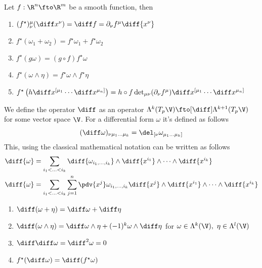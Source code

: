 \documentclass[../mmf.tex]{subfiles}
\begin{document}
\begin{thm}
	Let $f:\R^n\fto\R^m$ be a smooth function, then
	\begin{enumerate}
	\item $(f^\star)^\mu_\nu(\diff x^\nu)=\diff f=\partial_\nu f^\mu\diff{x^\nu}$
	\item $f^\star(\omega_1+\omega_2)=f^\star\omega_1+f^\star\omega_2$
	\item $f^\star(g\omega)=(g\circ f)f^\star\omega$
	\item $f^\star(\omega\wedge\eta)=f^\star\omega\wedge f^\star\eta$
	\item $f^\star\left( h\diff x^{[\mu_1}\cdots\diff x^{\mu_n]} \right)=h\circ f\det_{\mu\nu}(\partial_\nu f^\mu)\diff x^{[\mu_1}\cdots\diff x^{\mu_n]}$
	\end{enumerate}
\end{thm}
\begin{dfn}
	We define the operator $\diff$ as an operator $\Lambda^k(T_p\V)\fto[\diff]\Lambda^{k+1}(T_p\V)$ for some vector space $\V$. For a differential form $\omega$ it's defined as follows
	\begin{equation}
		(\diff\omega)_{\nu\mu_1\ldots\mu_k}=\del_{[\nu}\omega_{\mu_1\ldots\mu_k]}
		\label{eq:exteriorderivative}
	\end{equation}
	This, using the classical mathematical notation can be written as follows
	\begin{equation}
		\begin{aligned}
			\diff{\omega}&=\sum_{i_1<\ldots<i_k}\diff{\omega_{i_1,\ldots,i_k}}\wedge\diff{x^{i_1}}\wedge\cdots\wedge\diff{x^{i_k}}\\
			\diff{\omega}&=\sum_{i_1<\ldots<i_k}\sum_{j=1}^n\pdv{x^j}\omega_{i_1,\ldots,i_k}\diff{x^j}\wedge\diff{x^{i_1}}\wedge\cdots\wedge\diff{x^{i_k}}
		\end{aligned}
		\label{eq:diffdform}
	\end{equation}
\end{dfn}
\begin{thm}[Properties of $d$]
	\begin{enumerate}
	\item $\diff(\omega+\eta)=\diff\omega+\diff\eta$
	\item $\diff(\omega\wedge\eta)=\diff\omega\wedge\eta+(-1)^k\omega\wedge\diff\eta$ for $\omega\in\Lambda^k(\V),\ \eta\in\Lambda^l(\V)$
	\item $\diff\diff\omega=\diff^2\omega=0$
	\item $f^\star(\diff\omega)=\diff(f^\star\omega)$
	\end{enumerate}
\end{thm}
\end{document}
